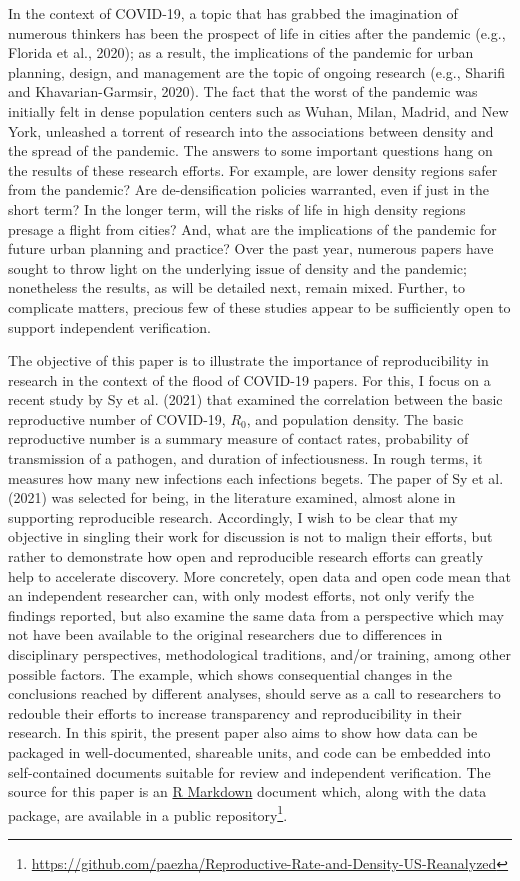 \documentclass[]{elsarticle} %
\begin{document}
In the context of COVID-19, a topic that has grabbed the imagination of
numerous thinkers has been the prospect of life in cities after the
pandemic (e.g., Florida et al., 2020); as a result, the implications of
the pandemic for urban planning, design, and management are the topic of
ongoing research (e.g., Sharifi and Khavarian-Garmsir, 2020). The fact
that the worst of the pandemic was initially felt in dense population
centers such as Wuhan, Milan, Madrid, and New York, unleashed a torrent
of research into the associations between density and the spread of the
pandemic. The answers to some important questions hang on the results of
these research efforts. For example, are lower density regions safer
from the pandemic? Are de-densification policies warranted, even if just
in the short term? In the longer term, will the risks of life in high
density regions presage a flight from cities? And, what are the
implications of the pandemic for future urban planning and practice?
Over the past year, numerous papers have sought to throw light on the
underlying issue of density and the pandemic; nonetheless the results,
as will be detailed next, remain mixed. Further, to complicate matters,
precious few of these studies appear to be sufficiently open to support
independent verification.

The objective of this paper is to illustrate the importance of
reproducibility in research in the context of the flood of COVID-19
papers. For this, I focus on a recent study by Sy et al. (2021) that
examined the correlation between the basic reproductive number of
COVID-19, \(R_0\), and population density. The basic reproductive number
is a summary measure of contact rates, probability of transmission of a
pathogen, and duration of infectiousness. In rough terms, it measures
how many new infections each infections begets. The paper of Sy et al.
(2021) was selected for being, in the literature examined, almost alone
in supporting reproducible research. Accordingly, I wish to be clear
that my objective in singling their work for discussion is not to malign
their efforts, but rather to demonstrate how open and reproducible
research efforts can greatly help to accelerate discovery. More
concretely, open data and open code mean that an independent researcher
can, with only modest efforts, not only verify the findings reported,
but also examine the same data from a perspective which may not have
been available to the original researchers due to differences in
disciplinary perspectives, methodological traditions, and/or training,
among other possible factors. The example, which shows consequential
changes in the conclusions reached by different analyses, should serve
as a call to researchers to redouble their efforts to increase
transparency and reproducibility in their research. In this spirit, the
present paper also aims to show how data can be packaged in
well-documented, shareable units, and code can be embedded into
self-contained documents suitable for review and independent
verification. The source for this paper is an
\href{http://rmarkdown.rstudio.com}{R Markdown} document which, along
with the data package, are available in a public repository\footnote{\url{https://github.com/paezha/Reproductive-Rate-and-Density-US-Reanalyzed}}.
\end{document}
